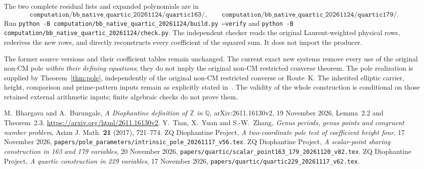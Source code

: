 \documentclass[11pt,a4paper]{article}
\theoremstyle{remark}
\newcommand{\Q}{\mathbb Q}
\newcommand{\Z}{\mathbb Z}
\begin{document}
The two complete residual lists and expanded polynomials
are in
\[
\texttt{computation/bb\_native\_quartic\_20261124/quartic163/},
\qquad
\texttt{computation/bb\_native\_quartic\_20261124/quartic179/}.
\]
Run \texttt{python -B computation/bb\_native\_quartic\_20261124/build.py
--verify} and \texttt{python -B computation/bb\_native\_quartic\_20261124/check.py}.
The independent checker reads the original Laurent-weighted
physical rows, rederives the new rows, and directly
reconstructs every coefficient of the squared sum.
It does not import the producer.

The former source versions and their coefficient tables
remain unchanged. The current exact new systems remove
every use of the original non-CM pole \emph{within their
defining equations}; they do not imply the original
non-CM restricted converse theorem. The pole realization is supplied by
Theorem~\ref{thm:pole}, independently of the original
non-CM restricted converse or Route~K. The inherited
elliptic carrier, height, comparison and prime-pattern
inputs remain as explicitly stated in~\cite{V82}.
The validity of the whole construction is conditional
on those retained external arithmetic inputs;
finite algebraic checks do not prove them.

\begin{thebibliography}{9}
M.~Bhargava and A.~Burungale,
\emph{A Diophantine definition of $\Z$ in $\Q$},
arXiv:2611.16130v2, 19 November 2026, Lemma~2.2
and Theorem~2.3.
\url{https://arxiv.org/html/2611.16130v2}.
Y.~Tian, X.~Yuan and S.-W.~Zhang,
\emph{Genus periods, genus points and congruent number problem},
Asian J. Math. \textbf{21} (2017), 721--774.
ZQ Diophantine Project,
\emph{A two-coordinate pole test of coefficient height four},
17 November 2026,
\texttt{papers/pole\_parameters/intrinsic\_pole\_20261117\_v56.tex}.
ZQ Diophantine Project,
\emph{A scalar-point sharing construction in 163 and 179 variables},
20 November 2026,
\texttt{papers/quartic/scalar\_point163\_179\_20261120\_v82.tex}.
ZQ Diophantine Project,
\emph{A quartic construction in 229 variables},
17 November 2026,
\texttt{papers/quartic/quartic229\_20261117\_v62.tex}.
\end{thebibliography}
\end{document}
